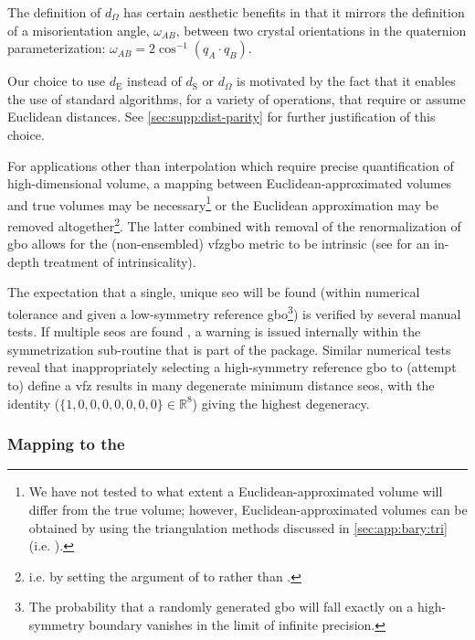 \documentclass[final,twocolumn,12pt]{elsarticle}
\begin{document}
The definition of $d_\Omega$ has certain aesthetic benefits in that it mirrors the definition of a misorientation angle, $\omega_{AB}$, between two crystal orientations in the quaternion parameterization: $\omega_{AB} = 2 \cos^{-1}{\left(q_A \cdot q_B\right)}$.

Our choice to use $d_{\text{E}}$ instead of $d_{\text{S}}$ or $d_\Omega$ is motivated by the fact that it enables the use of standard algorithms, for a variety of operations, that require or assume Euclidean distances. See \cref{sec:supp:dist-parity} for further justification of this choice. %

For applications other than interpolation which require precise quantification of high-dimensional volume, a mapping between Euclidean-approximated volumes and true volumes may be necessary\footnote{We have not tested to what extent a Euclidean-approximated volume will differ from the true volume; however, Euclidean-approximated volumes can be obtained by using the triangulation methods discussed in \cref{sec:app:bary:tri} (i.e. ).} or the Euclidean approximation may be removed altogether\footnote{i.e. by setting the  argument of  to  rather than .}. The latter combined with removal of the renormalization of \gls{gbo} allows for the (non-ensembled) \gls{vfzgbo} metric to be intrinsic (see \citet{morawiecDistancesGrainInterfaces2019} for an in-depth treatment of intrinsicality).

The expectation that a single, unique \gls{seo} will be found (within numerical tolerance and given a low-symmetry reference \gls{gbo}\footnote{The probability that a randomly generated \gls{gbo} will fall exactly on a high-symmetry boundary vanishes in the limit of infinite precision. }) is verified by several manual tests. If multiple \glspl{seo} are found%
, a warning is issued internally within the symmetrization sub-routine  \cite{bairdFiveDegreeofFreedom5DOF2020} that is part of the  package. Similar numerical tests reveal that inappropriately selecting a high-symmetry reference \gls{gbo} to (attempt to) define a \gls{vfz} results in many degenerate minimum distance \glspl{seo}, with the identity ($\{1,0,0,0,0,0,0,0\}\in\mathbb{R}^8$) \cite{francisGeodesicOctonionMetric2019} giving the highest degeneracy.

\subsubsection{Mapping  to the }
\label{sec:methods:framework:proj}
\end{document}
